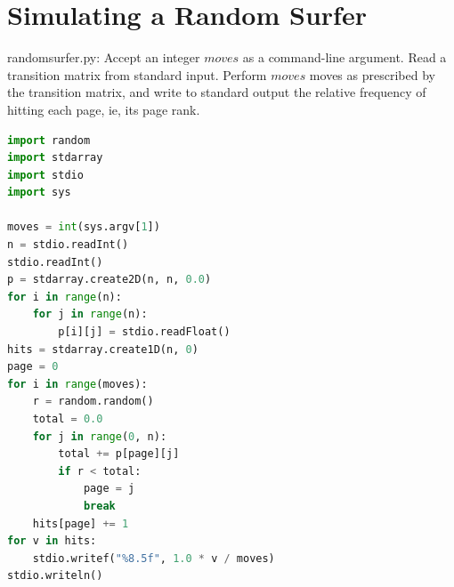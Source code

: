 \documentclass[8pt,a4paper,compress]{beamer}
\begin{document}
\section{Simulating a Random Surfer}
\begin{frame}[fragile]
\pause

\begin{framed}
\tiny randomsurfer.py: Accept an integer $moves$ as a command-line argument. Read a transition matrix from standard input. Perform $moves$ moves as prescribed by the transition matrix, and write to standard output the relative frequency of hitting each page, ie, its page rank.
\end{framed}

\begin{minipage}{170pt}
\begin{lstlisting}[language=Python]
import random
import stdarray
import stdio
import sys

moves = int(sys.argv[1])
n = stdio.readInt()
stdio.readInt()
p = stdarray.create2D(n, n, 0.0)
for i in range(n):
    for j in range(n):
        p[i][j] = stdio.readFloat()
hits = stdarray.create1D(n, 0)
page = 0
for i in range(moves):
    r = random.random()
    total = 0.0
    for j in range(0, n):
        total += p[page][j]
        if r < total:
            page = j
            break
    hits[page] += 1
for v in hits:
    stdio.writef("%8.5f", 1.0 * v / moves)
stdio.writeln()
\end{lstlisting}
\end{minipage}
\begin{minipage}{130pt}
\end{minipage}
\end{frame}
\end{document}

